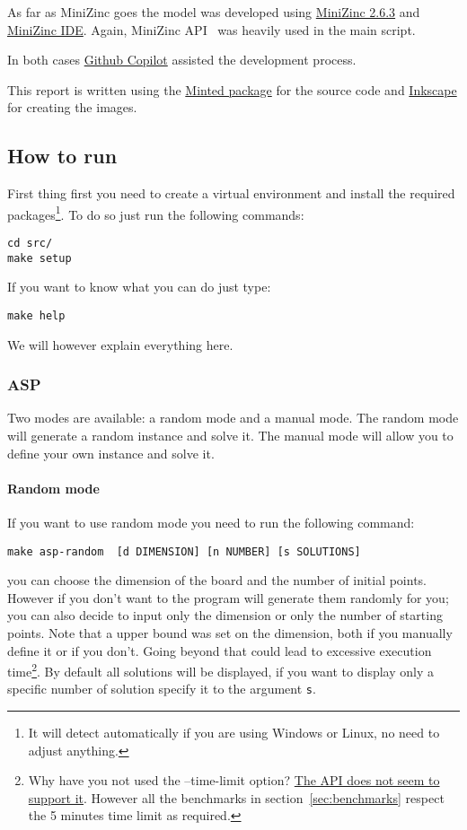 As far as MiniZinc goes the model was developed using \href{https://github.com/MiniZinc/libminizinc/releases/tag/2.6.3}{MiniZinc 2.6.3} and \href{https://www.minizinc.org/ide/}{MiniZinc IDE}. Again, MiniZinc API~\cite{MiniZincPython} was heavily used in the main script.

In both cases \href{https://copilot.github.com/}{Github Copilot} assisted the development process.

This report is written using the \href{https://ctan.org/pkg/minted?lang=en}{Minted package} for the source code and \href{https://inkscape.org/}{Inkscape} for creating the images.


\subsection{How to run}
First thing first you need to create a virtual environment and install the required packages\footnote{It will detect automatically if you are using Windows or Linux, no need to adjust anything.}. To do so just run the following commands:
\begin{verbatim}
cd src/
make setup
\end{verbatim}
If you want to know what you can do just type:

\begin{verbatim}
make help 
\end{verbatim}
We will however explain everything here.

\subsubsection{ASP}
Two modes are available: a random mode and a manual mode. The random mode will generate a random instance and solve it. The manual mode will allow you to define your own instance and solve it.

\paragraph{Random mode}

If you want to use random mode you need to run the following command:
\begin{verbatim}
make asp-random  [d DIMENSION] [n NUMBER] [s SOLUTIONS]
\end{verbatim}

you can choose the dimension of the board and the number of initial points. However if you don't want to the program will generate them randomly for you; you can also decide to input only the dimension or only the number of starting points. Note that a upper bound was set on the dimension, both if you manually define it or if you don't. Going beyond that could lead to excessive execution time\footnote{Why have you not used the --time-limit option? \href{https://github.com/potassco/clingo/issues/151}{The API does not seem to support it}. However all the benchmarks in section~\ref{sec:benchmarks} respect the 5 minutes time limit as required.}.
By default all solutions will be displayed, if you want to display only a specific number of solution specify it to the argument \texttt{s}. 

